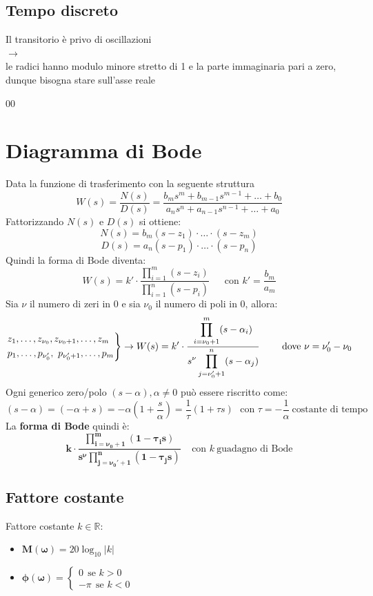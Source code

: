 \documentclass{report}
\theoremstyle{nostyle}
\begin{document}
\subsection*{Tempo discreto}
\begin{center}
Il transitorio è privo di oscillazioni\\
$\to$    \\
le radici hanno modulo minore stretto di 1 e la parte immaginaria pari a zero, dunque bisogna stare sull'asse reale
\end{center}
 00

\section{Diagramma di Bode}
Data la funzione di trasferimento con la seguente struttura
\[  W(s) = \frac{N(s)}{D(s)} = \frac{b_m s^m + b_{m-1} s^{m-1}+\dots+b_0}{
    a_n s^n + a_{n-1} s^{n-1} + \dots + a_0
}    \]
Fattorizzando $N(s)$ e $D(s)$ si ottiene:
\[    N(s) = b_m (s-z_1)\cdot \dots \cdot (s-z_m)      \]
\[    D(s) = a_n (s-p_1)\cdot \dots \cdot (s-p_n)  \]
Quindi la forma di Bode diventa:
\[     W(s) = k' \cdot \frac{\displaystyle \prod_{i = 1}^{m}(s-z_i)}{\displaystyle \prod_{i=1}^{n}(s-p_i)} 
\ \ \ \ \ \ \ \text{con } k' = \frac{b_m}{a_m}
\]
Sia $\nu$ il numero di zeri in $0$ e sia $\nu_0$ il numero di poli in $0$, allora:
\[      
\begin{rcases}
z_1,\dots, z_{\nu_0}, z_{\nu_0 +1 }, \dots , z_m\\
p_1,\dots, p_{\nu_0 '},\  p_{\nu_0' +1 }, \dots , p_m  
\end{rcases}
\to W(s) = k' \cdot \frac{\displaystyle \prod_{i = \nu_0 +1}^{m}(s-\alpha_i)}{\displaystyle s^\nu \prod_{j= \nu_0' +1}^{n}(s-\alpha_j)} \ \ \ \ \ \ \ \text{dove } \nu = \nu_0' -\nu_0 
\]
Ogni generico zero/polo $(s-\alpha), \alpha \neq 0$ può essere riscritto come:
\[     (s-\alpha) = (-\alpha + s )  = -\alpha\left(1+\frac{s}{\alpha}\right)  = 
    \frac{1}{\tau} \left(  1 + \tau s  \right)\ \ \ \text{con } \tau = -\frac{1}{\alpha}\ \text{costante di tempo}
\]
La \textbf{forma di Bode} quindi è:
\[   \bm{   k \cdot \frac{\displaystyle \prod_{i = \nu_0 +1}^{m}(1-\tau_i s)}{\displaystyle s^\nu \prod_{j= \nu_0' +1}^{n}(1-\tau_j s)}  } \ \ \ \ \ \text{con } 
        k \ \text{guadagno di Bode} 
\]


\subsection{Fattore costante}
Fattore costante $k \in \mathbb{R}$:
\begin{itemize}
    \item $\bm{M(\omega)} = 20 \log _{10} |k|$
    \item $\bm{\phi (\omega)} = \begin{cases}
        0 \ \ \text{se } k > 0 \\
        -\pi \ \ \text{se } k < 0
    \end{cases}$
\end{itemize}
\end{document}
